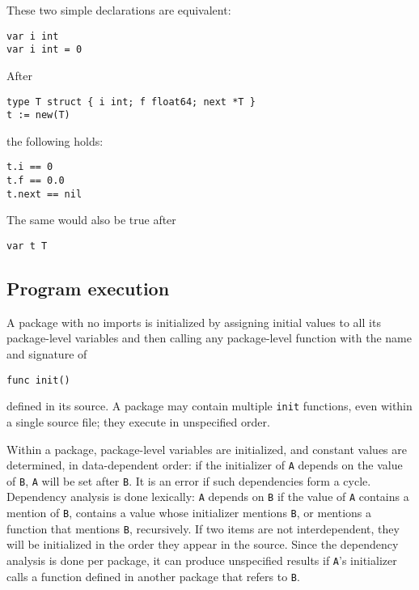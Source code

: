 {These two simple declarations are equivalent:

\begin{Verbatim}[frame=single]
var i int
var i int = 0
\end{Verbatim}

After

\begin{Verbatim}[frame=single]
type T struct { i int; f float64; next *T }
t := new(T)
\end{Verbatim}

the following holds:

\begin{Verbatim}[frame=single]
t.i == 0
t.f == 0.0
t.next == nil
\end{Verbatim}

The same would also be true after

\begin{Verbatim}[frame=single]
var t T
\end{Verbatim}

\subsection*{Program execution}

A package with no imports is initialized by assigning initial values to
all its package-level variables and then calling any package-level
function with the name and signature of

\begin{Verbatim}[frame=single]
func init()
\end{Verbatim}

defined in its source. A package may contain multiple \texttt{init}
functions, even within a single source file; they execute in unspecified
order.

Within a package, package-level variables are initialized, and constant
values are determined, in data-dependent order: if the initializer of
\texttt{A} depends on the value of \texttt{B}, \texttt{A} will be set
after \texttt{B}. It is an error if such dependencies form a cycle.
Dependency analysis is done lexically: \texttt{A} depends on \texttt{B}
if the value of \texttt{A} contains a mention of \texttt{B}, contains a
value whose initializer mentions \texttt{B}, or mentions a function that
mentions \texttt{B}, recursively. If two items are not interdependent,
they will be initialized in the order they appear in the source. Since
the dependency analysis is done per package, it can produce unspecified
results if \texttt{A}'s initializer calls a function defined in another
package that refers to \texttt{B}.

}
